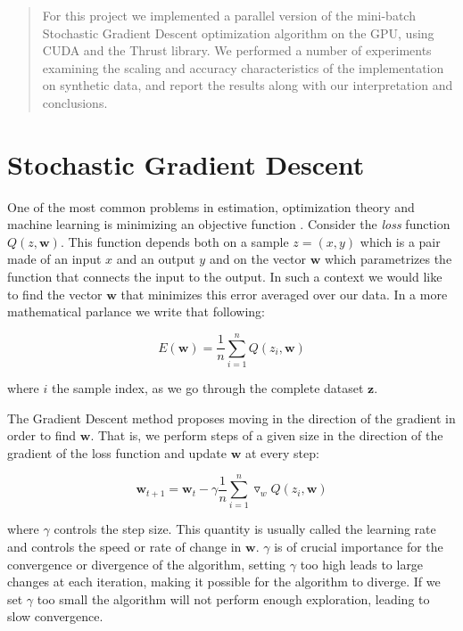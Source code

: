 \documentclass[11pt,a4paper]{article}
\newcommand{\Wb}{\mathbf{w}}
\begin{document}
\begin{abstract}
For this project we implemented a parallel version of the mini-batch
Stochastic Gradient Descent optimization algorithm on the GPU, using
CUDA and the Thrust library. We performed a number of experiments
examining the scaling and accuracy characteristics of the implementation
on synthetic data, and report the results along with our interpretation
and conclusions.

\end{abstract}

\section{Stochastic Gradient Descent}


One of the most common problems in estimation, optimization theory and machine learning is
minimizing an objective function \citep{bottou2010large}. Consider the \textit{loss} function $Q(z,
\Wb)$. This function depends both on a sample $z=(x, y)$ which is a pair made of an input $x$ and an
output $y$ and on the vector $\Wb$ which parametrizes the function that connects the input to the
output. In such a context we would like to find the vector $\Wb$ that minimizes this error averaged
over our data. In a more mathematical parlance we write that following:

\begin{equation}
E(\Wb) = \frac{1}{n} \sum_{i=1}^n Q(z_i, \Wb)
\end{equation}

where $i$ the sample index, as we go through the complete dataset $\mathbf{z}$.

The Gradient Descent method proposes moving in the direction of the gradient in order to
find $\Wb$. That is, we perform steps of a given size in the direction of the gradient of the loss function and update $\Wb$ at every step:

\begin{equation}
\Wb_{t + 1} = \Wb_t - \gamma \frac{1}{n} \sum_{i=1}^n \triangledown_w Q(z_i, \Wb)
\end{equation}

where $\gamma$ controls the step size. This quantity is usually called the learning rate and
controls the speed or rate of change in $\Wb$. $\gamma$ is of crucial importance for the
convergence or divergence of the algorithm, setting $\gamma$ too high leads to large changes at each iteration,
making it possible for the algorithm to diverge. If we set $\gamma$ too small the algorithm
will not perform enough exploration, leading to slow convergence.
\end{document}
